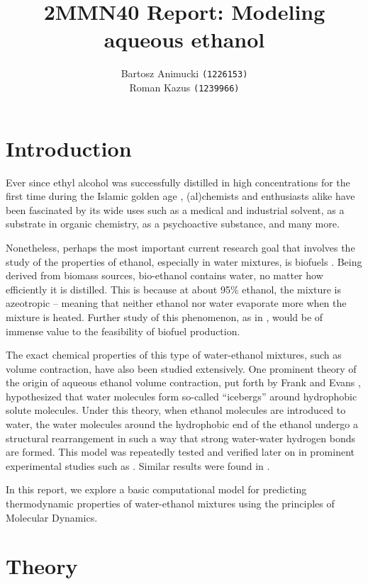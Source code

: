 \documentclass[11pt,a4paper]{article}
\author{Bartosz Animucki {\tt (1226153)} \\ Roman Kazus {\tt (1239966)}}
\title{2MMN40 Report: Modeling aqueous ethanol}
\begin{document}
\maketitle

\setcounter{secnumdepth}{2}
\setcounter{tocdepth}{2}
\tableofcontents
\clearpage  
\section{Introduction}
Ever since ethyl alcohol was successfully distilled in high concentrations for the first time during the Islamic golden age \cite{first_distil}, (al)chemists and enthusiasts alike have been fascinated by its wide uses such as a medical and industrial solvent, as a substrate in organic chemistry, as a psychoactive substance, and many more. 
	
Nonetheless, perhaps the most important current research goal that involves the study of the properties of ethanol, especially in water mixtures, is biofuels \cite{quovadis} \cite{fuelcell}. Being derived from biomass sources, bio-ethanol contains water, no matter how efficiently it is distilled. This is because at about 95\% ethanol, the mixture is azeotropic -- meaning that neither ethanol nor water evaporate more when the mixture is heated. Further study of this phenomenon, as in \cite{azeobreak}, would be of immense value to the feasibility of biofuel production. 
	
The exact chemical properties of this type of water-ethanol mixtures, such as volume contraction, have also been studied extensively. One prominent theory of the origin of aqueous ethanol volume contraction, put forth by Frank and Evans \cite{frankevans}, hypothesized that water molecules form so-called ``icebergs'' around hydrophobic solute molecules. Under this theory, when ethanol molecules are introduced to water, the water molecules around the hydrophobic  end  of  the  ethanol  undergo  a  structural rearrangement in such a way that strong water-water hydrogen bonds are formed. This model was repeatedly tested and verified later on in prominent experimental studies such as \cite{parke}. Similar results were found in \cite{guoetal}.
	
In this report, we explore a basic computational model for predicting thermodynamic properties of water-ethanol mixtures using the principles of Molecular Dynamics.
	
\section{Theory}
\end{document}
